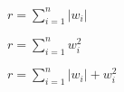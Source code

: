 \documentclass{article}
\begin{document}
$r=\sum\limits_{i=1}^n \left|w_i\right|$
\pagebreak

$r=\sum\limits_{i=1}^n w_i^2$
\pagebreak

$r=\sum\limits_{i=1}^n \left|w_i\right| + w_i^2$
\pagebreak
\end{document}
